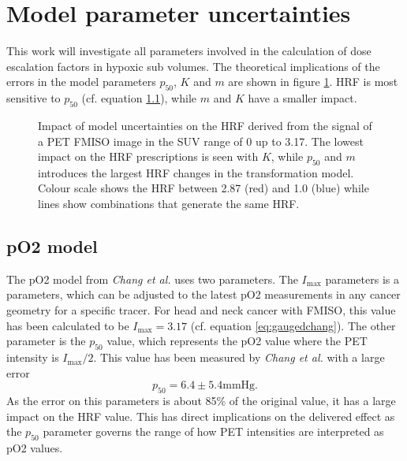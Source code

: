 \section{Model parameter uncertainties}
This work will investigate all parameters involved in the calculation of dose escalation factors in hypoxic sub volumes. The theoretical implications of the errors in the model parameters $p_{50}$, $K$ and $m$ are shown in figure \ref{fig:uncertaintyimpact}. HRF is most sensitive to $p_{50}$ (cf. equation \ref{}), while $m$ and $K$ have a smaller impact. 
\begin{figure}[p]
\centering
{}
\hspace{0.3cm}
\hspace{0.3cm}
\hspace{0.3cm}
\hspace{0.3cm}
\caption{Impact of model uncertainties on the HRF derived from the signal of a PET FMISO image in the SUV range of 0 up to 3.17. The lowest impact on the HRF prescriptions is seen with $K$, while $p_{50}$ and $m$ introduces the largest HRF changes in the transformation model. Colour scale shows the HRF between 2.87 (red) and 1.0 (blue) while lines show combinations that generate the same HRF.}
\label{fig:uncertaintyimpact}
\end{figure}
\subsection{pO2 model}
The pO2 model from \textit{Chang et al.} \cite{pmid19994538} uses two parameters. The $I_\mathrm{max}$ parameters is a parameters, which can be adjusted to the latest pO2 measurements in any cancer geometry for a specific tracer. For head and neck cancer with FMISO, this value has been calculated to be $I_\mathrm{max}=3.17$ (cf. equation \ref{eq:gaugedchang}). The other parameter is the $p_{50}$ value, which represents the pO2 value where the PET intensity is $I_\mathrm{max}/2$. This value has been measured by \textit{Chang et al.} with a large error
\begin{equation}
p_\mathrm{50} = 6.4 \pm 5.4 \mathrm{mmHg}.
\end{equation}
As the error on this parameters is about 85\% of the original value, it has a large impact on the HRF value. This has direct implications on the delivered effect as the $p_{50}$ parameter governs the range of how PET intensities are interpreted as pO2 values.

